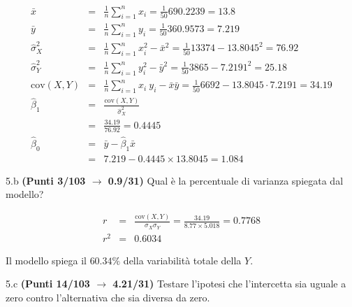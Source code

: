 \documentclass[
  11pt,
]{book}
\theoremstyle{mytheoremstyle}
\theoremstyle{mydefstyle}
\newenvironment{sol}
  {
  \begin{tcolorbox}[enhanced,breakable,arc=0.1mm,boxrule=1pt,colback=white,colframe=iblue,
  title=\bf \fontfamily{lmss}\selectfont \hspace{.5 cm} Soluzione,drop fuzzy shadow]

}{
\end{tcolorbox}
  }
\begin{document}
\begin{sol}
\begin{eqnarray*}
           \bar x &=&\frac 1 n\sum_{i=1}^n x_i = \frac {1}{ 50 }  690.2239 =  13.8 \\
           \bar y &=&\frac 1 n\sum_{i=1}^n y_i = \frac {1}{ 50 }  360.9573 =  7.219 \\
           \hat\sigma_X^2&=&\frac 1 n\sum_{i=1}^n x_i^2-\bar x^2=\frac {1}{ 50 }  13374  - 13.8045 ^2= 76.92 \\
           \hat\sigma_Y^2&=&\frac 1 n\sum_{i=1}^n y_i^2-\bar y^2=\frac {1}{ 50 }  3865  - 7.2191 ^2= 25.18 \\
           \text{cov}(X,Y)&=&\frac 1 n\sum_{i=1}^n x_i~y_i-\bar x\bar y=\frac {1}{ 50 }  6692 - 13.8045 \cdot 7.2191 = 34.19 \\
           \hat\beta_1 &=& \frac{\text{cov}(X,Y)}{\hat\sigma_X^2} \\
                    &=& \frac{ 34.19 }{ 76.92 }  =  0.4445 \\
           \hat\beta_0 &=& \bar y - \hat\beta_1 \bar x\\
                    &=&  7.219 - 0.4445 \times  13.8045 = 1.084 
         \end{eqnarray*}

\end{sol}

5.b \textbf{(Punti 3/103 \(\rightarrow\) 0.9/31)} Qual è la percentuale di varianza spiegata dal modello?

\begin{sol}
\begin{eqnarray*}
r&=&\frac{\text{cov}(X,Y)}{\sigma_X\sigma_Y}=\frac{ 34.19 }{ 8.77 \times 5.018 }= 0.7768 \\ 
r^2&=& 0.6034\end{eqnarray*}

Il modello spiega il \(60.34\%\) della variabilità totale della \(Y\).

\end{sol}

5.c \textbf{(Punti 14/103 \(\rightarrow\) 4.21/31)} Testare l'ipotesi che l'intercetta sia uguale a zero contro l'alternativa che sia diversa da zero.
\end{document}
